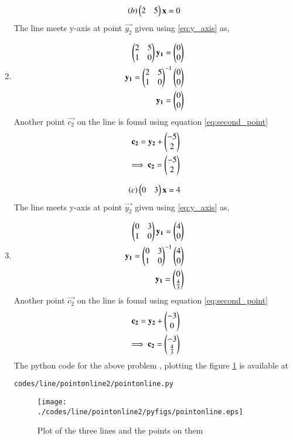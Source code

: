 \begin{enumerate}[label=\thesection.\arabic*.,ref=\thesection.\theenumi]
\begin{align}
\left(b\right)\begin{pmatrix}2&5\end{pmatrix}\mathbf{x}=0
\end{align}
The line meets y-axis at point $\vec{y_2}$ given using \ref{eq:y_axis} as,
\item 
\begin{align}
\begin{pmatrix}2&5\\1&0\end{pmatrix}\mathbf{y_1} =\begin{pmatrix}0\\0\end{pmatrix}
\\
\mathbf{y_1}={\begin{pmatrix}2&5\\1&0\end{pmatrix}}^{-1}\begin{pmatrix}0\\0\end{pmatrix}
\\
\mathbf{y_1}=\begin{pmatrix}0\\0\end{pmatrix}
\end{align}
Another point $\vec{c_2}$ on the line is found using equation \ref{eq:second_point}
\begin{align}
\mathbf{c_2} = \mathbf{y_2} + \begin{pmatrix}-5\\2\end{pmatrix}
\\
\implies \mathbf{c_2} = \begin{pmatrix}-5\\2\end{pmatrix}
\end{align}

\begin{align}
\left(c\right)\begin{pmatrix}0&3\end{pmatrix}\mathbf{x}=4
\end{align}
The line meets y-axis at point $\vec{y_2}$ given using \ref{eq:y_axis} as,
\item 
\begin{align}
\begin{pmatrix}0&3\\1&0\end{pmatrix}\mathbf{y_1} =\begin{pmatrix}4\\0\end{pmatrix}
\\
\mathbf{y_1}={\begin{pmatrix}0&3\\1&0\end{pmatrix}}^{-1}\begin{pmatrix}4\\0\end{pmatrix}
\\
\mathbf{y_1}=\begin{pmatrix}0\\\frac{4}{3}\end{pmatrix}
\end{align}
Another point $\vec{c_2}$ on the line is found using equation \ref{eq:second_point}
\begin{align}
\mathbf{c_2} = \mathbf{y_2} + \begin{pmatrix}-3\\0\end{pmatrix}
\\
\implies \mathbf{c_2} = \begin{pmatrix}-3\\\frac{4}{3}\end{pmatrix}
\end{align}
The python code for the above problem , plotting the figure \ref{fig:three_lines} is available at 
\begin{lstlisting}
codes/line/pointonline2/pointonline.py
\end{lstlisting}
\begin{figure}[!ht]
\centering
\texttt{[image: ./codes/line/pointonline2/pyfigs/pointonline.eps]}
\caption{Plot of the three lines and the points on them }
\label{fig:three_lines}
\end{figure}

\end{enumerate}
